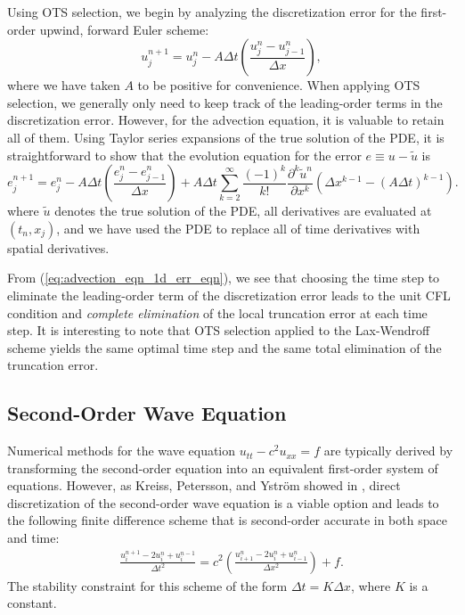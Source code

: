 \documentclass[fleqn,12pt,twoside]{article}
\newcommand{\beq}{\begin{equation}}
\newcommand{\eeq}{\end{equation}}
\newcommand{\bea}{\begin{eqnarray}}
\newcommand{\eea}{\end{eqnarray}}
\def\px{\partial x}
\def\tu{\tilde{u}}
\def\dt{\Delta t}
\def\dx{\Delta x}
\begin{document}
Using OTS selection, we begin by analyzing the discretization error for the 
first-order upwind, forward Euler scheme:
\beq
  u^{n+1}_j = u^{n}_j 
  - A \dt \left( \frac{u^{n}_j - u^{n}_{j-1}}{\dx} \right),
  \label{eq:advection_eqn_1d_FD_scheme}
\eeq
where we have taken $A$ to be positive for convenience.  When applying OTS 
selection, we generally only need to keep track of the leading-order terms in
the discretization error.  However, for the advection equation, it is valuable
to retain all of them.  Using Taylor series expansions of the true solution of
the PDE, it is straightforward to show that the evolution equation for the error
$e \equiv u - \tu$ is
\beq
  e^{n+1}_j = e^{n}_j 
    - A \dt \left( \frac{e^{n}_j - e^{n}_{j-1}}{\dx} \right) 
    + A \dt \sum_{k=2}^\infty \frac{\left( -1 \right)^k}{k!} 
        \frac{\partial^k \tu^n}{\px^k} 
        \left( \dx^{k-1} - \left( A \dt \right)^{k-1} \right).
  \label{eq:advection_eqn_1d_err_eqn}
\eeq
where $\tu$ denotes the true solution of the PDE, all derivatives are 
evaluated at $(t_n, x_j)$, and we have used the PDE to replace all of time 
derivatives with spatial derivatives.

From (\ref{eq:advection_eqn_1d_err_eqn}), we see that choosing the
time step to eliminate the leading-order term of the discretization error
leads to the unit CFL condition and \emph{complete elimination} of the local
truncation error at each time step.  It is interesting to note that OTS
selection applied to the Lax-Wendroff 
scheme \cite{leveque_book_2002,leveque_book_1992} yields the same optimal 
time step and the same total elimination of the truncation error.


\subsection{Second-Order Wave Equation\label{sec:wave_eqn_1d}}
Numerical methods for the wave equation $u_{tt} - c^2 u_{xx} = f$ are typically 
derived by transforming the second-order equation into an equivalent
first-order system of equations.  However, as Kreiss, Petersson, and Ystr\"om 
showed in \cite{kreiss2002}, direct discretization of the second-order wave 
equation is a viable option and leads to the following finite difference 
scheme that is second-order accurate in both space and time:
\bea
  \frac{u^{n+1}_i - 2 u^n_i + u^{n-1}_i}{\dt^2}
  = c^2 \left( \frac{u^{n}_{i+1} - 2 u^n_i + u^n_{i-1}}{\dx^2} \right)
  + f.
  \label{eq:wave_eqn_KPY}
\eea
The stability constraint for this scheme of the form $\dt = K \dx$, where 
$K$ is a constant.
\end{document}

